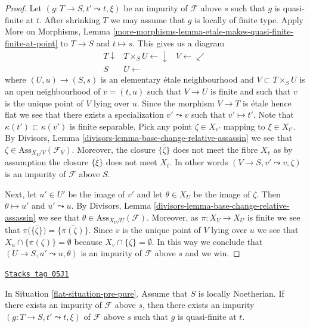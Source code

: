\begin{proof}
Let $(g : T \to S, t' \leadsto t, \xi)$ be an impurity of
$\mathcal{F}$ above $s$ such that $g$ is quasi-finite at $t$.
After shrinking $T$ we may assume that $g$ is locally of finite type.
Apply
More on Morphisms,
Lemma \ref{more-morphisms-lemma-etale-makes-quasi-finite-finite-at-point}
to $T \to S$ and $t \mapsto s$. This gives us a diagram
$$
\begin{array}{ccc}T \downarrow & T \times_S U \longleftarrow\downarrow & V \longleftarrow\swarrow \\ S & U \longleftarrow & \end{array}
$$
where $(U, u) \to (S, s)$ is an elementary \'etale neighbourhood
and $V \subset T \times_S U$ is an open neighbourhood of $v = (t, u)$
such that $V \to U$ is finite and such that $v$ is the unique point of $V$
lying over $u$. Since the morphism $V \to T$ is \'etale
hence flat we see that there exists a specialization $v' \leadsto v$ such
that $v' \mapsto t'$. Note that $\kappa(t') \subset \kappa(v')$
is finite separable. Pick any point $\zeta \in X_{v'}$ mapping to
$\xi \in X_{t'}$. By
Divisors, Lemma \ref{divisors-lemma-base-change-relative-assassin}
we see that $\zeta \in \text{Ass}_{X_V/V}(\mathcal{F}_V)$.
Moreover, the closure $\overline{\{\zeta\}}$ does not meet
the fibre $X_v$ as by assumption the closure $\overline{\{\xi\}}$
does not meet $X_t$. In other words $(V \to S, v' \leadsto v, \zeta)$
is an impurity of $\mathcal{F}$ above $S$.

\medskip\noindent
Next, let $u' \in U'$ be the image of $v'$ and let
$\theta \in X_U$ be the image of $\zeta$.
Then $\theta \mapsto u'$ and $u' \leadsto u$.
By
Divisors, Lemma \ref{divisors-lemma-base-change-relative-assassin}
we see that $\theta \in \text{Ass}_{X_U/U}(\mathcal{F})$.
Moreover, as $\pi : X_V \to X_U$ is finite we see that
$\pi\big(\overline{\{\zeta\}}\big) = \overline{\{\pi(\zeta)\}}$. Since
$v$ is the unique point of $V$ lying over $u$ we see that
$X_u \cap \overline{\{\pi(\zeta)\}} = \emptyset$ because
$X_v \cap \overline{\{\zeta\}} = \emptyset$. In this way we conclude that
$(U \to S, u' \leadsto u, \theta)$ is an impurity of
$\mathcal{F}$ above $s$ and we win.
\end{proof}

\begin{lemma}
\label{flat-lemma-Noetherian-impurity-quasi-finite}
\href{https://stacks.math.columbia.edu/tag/05J1}{\texttt{Stacks tag 05J1}}

In Situation \ref{flat-situation-pre-pure}.
Assume that $S$ is locally Noetherian.
If there exists an impurity of $\mathcal{F}$ above $s$, then
there exists an impurity $(g : T \to S, t' \leadsto t, \xi)$
of $\mathcal{F}$ above $s$ such that $g$ is quasi-finite at $t$.
\end{lemma}

